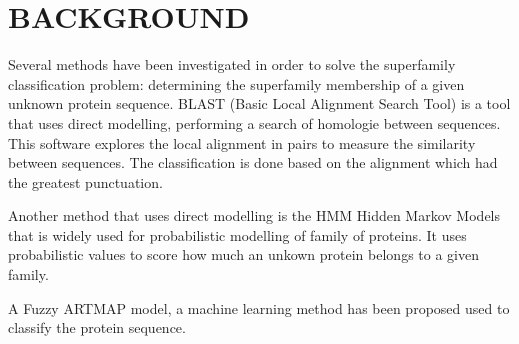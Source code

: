 \documentclass[a4paper, 10pt, conference]{ieeeconf}      %
\begin{document}
\section{BACKGROUND}
Several methods have been investigated in order to solve the superfamily classification problem: determining the superfamily membership of a given unknown protein sequence.
BLAST (Basic Local Alignment Search Tool) \cite{blast} is a
tool that uses direct modelling, performing a search of homologie
between sequences. This software explores the local
alignment in pairs to measure the similarity between sequences.
The classification is done based on the alignment
which had the greatest punctuation.

Another method that uses direct modelling is the HMM
Hidden Markov Models that is widely used for probabilistic
modelling of family of proteins. It uses probabilistic values
to score how much an unkown protein belongs to a given
family.

A Fuzzy ARTMAP model, a machine learning method has been proposed used to classify the protein sequence\cite{fuzzy}.
\end{document}
